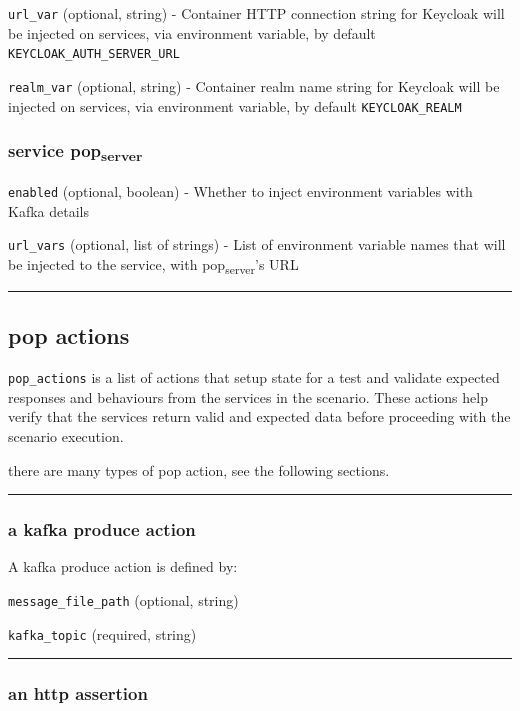 \documentclass[11pt]{article}
\begin{document}
\texttt{url\_var} (optional, string) - Container HTTP connection string for Keycloak will be injected on services, via environment variable, by default \texttt{KEYCLOAK\_AUTH\_SERVER\_URL}

\texttt{realm\_var} (optional, string) - Container realm name string for Keycloak will be injected on services, via environment variable, by default \texttt{KEYCLOAK\_REALM}


\subsubsection{service pop\textsubscript{server}}
\label{sec:orge28ba49}

\texttt{enabled} (optional, boolean) - Whether to inject environment variables with Kafka details

\texttt{url\_vars} (optional, list of strings) - List of environment variable names that will be injected to the service, with pop\textsubscript{server}'s URL


\noindent\rule{\textwidth}{0.5pt}

\subsection{pop actions}
\label{sec:org8b6a992}

\texttt{pop\_actions} is a list of actions that setup state for a test and validate expected responses and behaviours from the services in the scenario. These actions help verify that the services return valid and expected data before proceeding with the scenario execution.

there are many types of pop action, see the following sections.

\noindent\rule{\textwidth}{0.5pt}

\subsubsection{a kafka produce action}
\label{sec:orgc2d4433}

A kafka produce action is defined by:

\texttt{message\_file\_path} (optional, string)

\texttt{kafka\_topic} (required, string)


\noindent\rule{\textwidth}{0.5pt}

\subsubsection{an http assertion}
\label{sec:org2a981e9}
\end{document}
